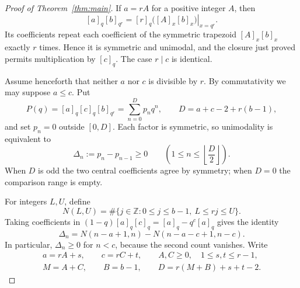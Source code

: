 \documentclass[11pt]{article}
\begin{document}
\begin{proof}[Proof of Theorem~\ref{thm:main}]
If $a=rA$ for a positive integer $A$, then
\[
 [a]_q[b]_{q^r}=[r]_q\left.\bigl([A]_x[b]_x\bigr)\right|_{x=q^r}.
\]
Its coefficients repeat each coefficient of the symmetric trapezoid
$[A]_x[b]_x$ exactly $r$ times. Hence it is symmetric and unimodal, and
the closure just proved permits multiplication by $[c]_q$.
The case $r\mid c$ is identical.

Assume henceforth that neither $a$ nor $c$ is divisible by $r$.
By commutativity we may suppose $a\le c$. Put
\[
 P(q)=[a]_q[c]_q[b]_{q^r}=\sum_{n=0}^D p_nq^n,
 \qquad D=a+c-2+r(b-1),
\]
and set $p_n=0$ outside $[0,D]$. Each factor is symmetric, so
unimodality is equivalent to
\begin{equation}\label{eq:half}
 \Delta_n:=p_n-p_{n-1}\ge0
 \qquad\left(1\le n\le\left\lfloor \frac D2\right\rfloor\right).
\end{equation}
When $D$ is odd the two central coefficients agree by symmetry; when
$D=0$ the comparison range is empty.

For integers $L,U$, define
\[
 N(L,U)=\#\{j\in\mathbb Z:0\le j\le b-1,\ L\le rj\le U\}.
\]
Taking coefficients in
$(1-q)[a]_q[c]_q=[a]_q-q^c[a]_q$ gives the identity
\begin{equation}\label{eq:counts}
 \Delta_n=N(n-a+1,n)-N(n-a-c+1,n-c).
\end{equation}
In particular, $\Delta_n\ge0$ for $n<c$, because the second count vanishes.
Write
\begin{equation}\label{eq:parameters}
 \begin{gathered}
 a=rA+s,\qquad c=rC+t,\qquad A,C\ge0,\quad 1\le s,t\le r-1,\\
 M=A+C,\qquad B=b-1,\qquad D=r(M+B)+s+t-2.
 \end{gathered}
\end{equation}


\end{proof}
\end{document}
